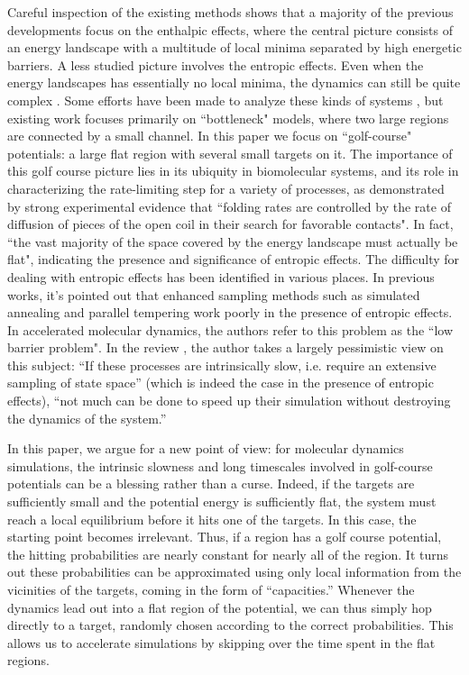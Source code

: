 \documentclass[english, aip, jcp, priprint, graphicx,floatfix]{revtex4-1}
\theoremstyle{plain}
\theoremstyle{definition}
\theoremstyle{plain}
\begin{document}
Careful inspection of the existing methods shows that a majority of the previous developments focus on the enthalpic effects, where the central picture consists of an energy landscape with a multitude of local minima separated by high energetic barriers.  A less studied picture involves the entropic effects.  Even when the energy landscapes has essentially no local minima, the dynamics can still be quite complex \cite{Baum1986-we, Wille1987-tf}.  Some efforts have been made to analyze these kinds of systems \cite{Reguera2001-qa, Lwin2005-dm, Mondal2010-oh, Huang2009-kc, Sorensen2000-qm}, but existing work focuses primarily on ``bottleneck" models, where two large regions are connected by a small channel.  In this paper we focus on ``golf-course" potentials: a large flat region with several small targets on it. The importance of this golf course picture lies in its ubiquity in biomolecular systems, and its role in characterizing the rate-limiting step for a variety of processes, as demonstrated by strong experimental  evidence \cite{Teschner1987-qs, Jacob1999-bs, Goldberg1999-mv, Plaxco1998-iv} that ``folding rates are controlled by the rate of diffusion of pieces of the open coil in their search for favorable contacts"\cite{McLeish2005-dq}. In fact, ``the vast majority of the space covered by the energy landscape must actually be flat"\cite{McLeish2005-dq}, indicating the presence and significance of entropic effects.  The difficulty for dealing with entropic effects has been identified in various places. In previous works\cite{Baum1986-we, Wille1987-tf, Machta2009-gh}, it's pointed out that enhanced sampling methods such as simulated annealing and parallel tempering work poorly in the presence of entropic effects. In accelerated molecular dynamics\cite{Sorensen2000-qm}, the authors refer to this problem as the ``low barrier problem". In the review \cite{Christen2008-ge}, the author takes a largely pessimistic view on this subject: ``If these processes are intrinsically slow, i.e. require an extensive sampling of state space'' (which is indeed the case in the presence of entropic effects), ``not much can be done to speed up their simulation without destroying the dynamics of the system.''

In this paper, we argue for a new point of view: for molecular dynamics simulations, the intrinsic slowness and long timescales involved in golf-course potentials can be a blessing rather than a curse.  Indeed, if the targets are sufficiently small and the potential energy is sufficiently flat, the system must reach a local equilibrium before it hits one of the targets. In this case, the starting point becomes irrelevant. Thus, if a region has a golf course potential, the hitting probabilities are nearly constant for nearly all of the region. It turns out these probabilities can be approximated using only local information from the vicinities of the targets, coming in the form of “capacities.”   Whenever the dynamics lead out into a flat region of the potential, we can thus simply hop directly to a target, randomly chosen according to the correct probabilities.  This allows us to accelerate simulations by skipping over the time spent in the flat regions.
\end{document}
